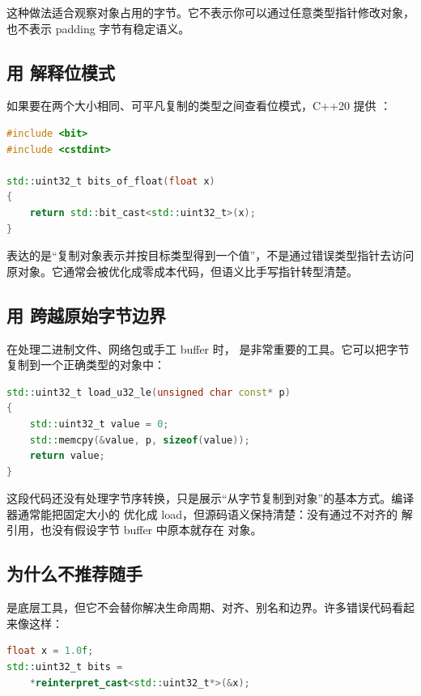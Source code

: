 这种做法适合观察对象占用的字节。它不表示你可以通过任意类型指针修改对象，也不表示 padding 字节有稳定语义。

\subsection{用  解释位模式}

如果要在两个大小相同、可平凡复制的类型之间查看位模式，C++20 提供 ：

\begin{lstlisting}[language=C++]
#include <bit>
#include <cstdint>

std::uint32_t bits_of_float(float x)
{
    return std::bit_cast<std::uint32_t>(x);
}
\end{lstlisting}

 表达的是“复制对象表示并按目标类型得到一个值”，不是通过错误类型指针去访问原对象。它通常会被优化成零成本代码，但语义比手写指针转型清楚。

\subsection{用  跨越原始字节边界}

在处理二进制文件、网络包或手工 buffer 时， 是非常重要的工具。它可以把字节复制到一个正确类型的对象中：

\begin{lstlisting}[language=C++]
std::uint32_t load_u32_le(unsigned char const* p)
{
    std::uint32_t value = 0;
    std::memcpy(&value, p, sizeof(value));
    return value;
}
\end{lstlisting}

这段代码还没有处理字节序转换，只是展示“从字节复制到对象”的基本方式。编译器通常能把固定大小的  优化成 load，但源码语义保持清楚：没有通过不对齐的  解引用，也没有假设字节 buffer 中原本就存在  对象。

\subsection{为什么不推荐随手 }

 是底层工具，但它不会替你解决生命周期、对齐、别名和边界。许多错误代码看起来像这样：

\begin{lstlisting}[language=C++]
float x = 1.0f;
std::uint32_t bits =
    *reinterpret_cast<std::uint32_t*>(&x);
\end{lstlisting}


